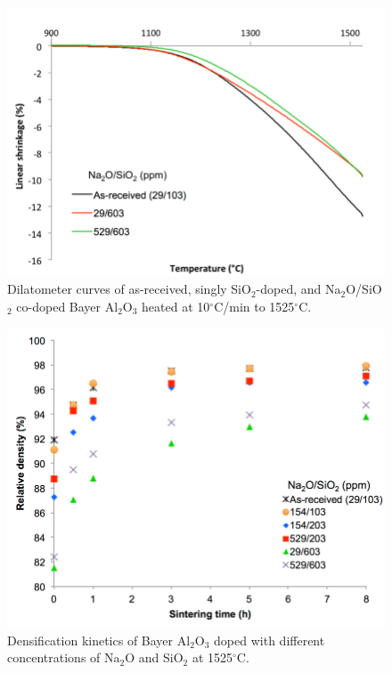 \newpage
\begin{figure}[H]
	\centering
	\includegraphics[width=\textwidth]{Chapter-2/Figures/Figure5.png}
	\caption{Dilatometer curves of as-received, singly SiO$_{2}$-doped, and Na$_{2}$O/SiO$_{2}$ co-doped Bayer Al$_{2}$O$_{3}$ heated at 10$^{\circ}$C/min to 1525$^{\circ}$C.}
	\label{Ch2-figure:Figure5}
\end{figure}

\newpage
\begin{figure}[H]
	\centering
	\includegraphics[width=\textwidth]{Chapter-2/Figures/Figure6.png}
	\caption{Densification kinetics of Bayer Al$_{2}$O$_{3}$ doped with different concentrations of Na$_{2}$O and SiO$_{2}$ at 1525$^{\circ}$C.}
	\label{Ch2-figure:Figure6}
\end{figure}

